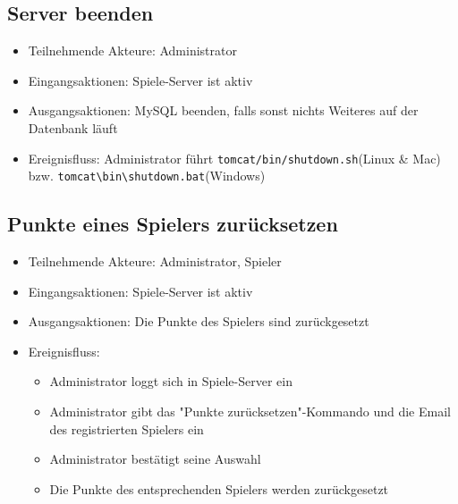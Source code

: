 \documentclass[a4paper]{scrreprt}
\begin{document}
    \subsection{Server beenden}
    \begin{itemize}
        \item Teilnehmende Akteure: \Gls{Administrator}
        \item Eingangsaktionen: Spiele-Server ist aktiv
        \item Ausgangsaktionen: MySQL beenden, falls sonst nichts Weiteres auf der Datenbank läuft
        \item Ereignisfluss: \Gls{Administrator} führt \texttt{tomcat/bin/shutdown.sh}(Linux \& Mac) bzw. \texttt{tomcat\textbackslash bin\textbackslash shutdown.bat}(Windows)
    \end{itemize}

    \subsection{Punkte eines Spielers zurücksetzen}
    \begin{itemize}
        \item Teilnehmende Akteure: \Gls{Administrator}, \Gls{Spieler}
        \item Eingangsaktionen: Spiele-Server ist aktiv
        \item Ausgangsaktionen: Die Punkte des \Gls{Spieler}s sind zurückgesetzt
        \item Ereignisfluss:
        \begin{itemize}
            \item \Gls{Administrator} loggt sich in Spiele-Server ein
            \item \Gls{Administrator} gibt das "Punkte zurücksetzen"-Kommando und die Email des registrierten Spielers ein
            \item \Gls{Administrator} bestätigt seine Auswahl
            \item Die Punkte des entsprechenden \Gls{Spieler}s werden zurückgesetzt
        \end{itemize}
    \end{itemize}
\end{document}
